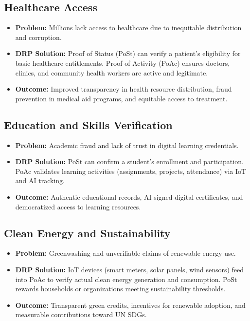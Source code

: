 \documentclass[11pt,a4paper]{article}
\begin{document}
\subsection{Healthcare Access}
\begin{itemize}
    \item \textbf{Problem:} Millions lack access to healthcare due to inequitable distribution and corruption.
    \item \textbf{DRP Solution:} Proof of Status (PoSt) can verify a patient’s eligibility for basic healthcare entitlements. Proof of Activity (PoAc) ensures doctors, clinics, and community health workers are active and legitimate.
    \item \textbf{Outcome:} Improved transparency in health resource distribution, fraud prevention in medical aid programs, and equitable access to treatment.
\end{itemize}

\subsection{Education and Skills Verification}
\begin{itemize}
    \item \textbf{Problem:} Academic fraud and lack of trust in digital learning credentials.
    \item \textbf{DRP Solution:} PoSt can confirm a student’s enrollment and participation. PoAc validates learning activities (assignments, projects, attendance) via IoT and AI tracking.
    \item \textbf{Outcome:} Authentic educational records, AI-signed digital certificates, and democratized access to learning resources.
\end{itemize}

\subsection{Clean Energy and Sustainability}
\begin{itemize}
    \item \textbf{Problem:} Greenwashing and unverifiable claims of renewable energy use.
    \item \textbf{DRP Solution:} IoT devices (smart meters, solar panels, wind sensors) feed into PoAc to verify actual clean energy generation and consumption. PoSt rewards households or organizations meeting sustainability thresholds.
    \item \textbf{Outcome:} Transparent green credits, incentives for renewable adoption, and measurable contributions toward UN SDGs.
\end{itemize}
\end{document}
